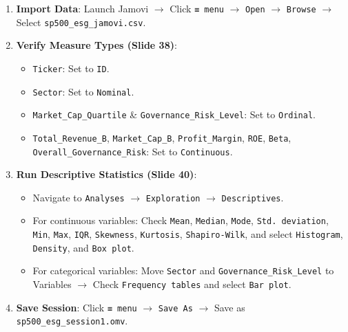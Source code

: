 \documentclass[
]{article}
\providecommand{\tightlist}{%
  \setlength{\itemsep}{0pt}\setlength{\parskip}{0pt}}
\begin{document}
\begin{enumerate}
\def\labelenumi{\arabic{enumi}.}
\tightlist
\item
  \textbf{Import Data}: Launch Jamovi \(\rightarrow\) Click
  \texttt{≡\ menu} \(\rightarrow\) \texttt{Open} \(\rightarrow\)
  \texttt{Browse} \(\rightarrow\) Select
  \texttt{sp500\_esg\_jamovi.csv}.
\item
  \textbf{Verify Measure Types (Slide 38)}:

  \begin{itemize}
  \tightlist
  \item
    \texttt{Ticker}: Set to \texttt{ID}.
  \item
    \texttt{Sector}: Set to \texttt{Nominal}.
  \item
    \texttt{Market\_Cap\_Quartile} \& \texttt{Governance\_Risk\_Level}:
    Set to \texttt{Ordinal}.
  \item
    \texttt{Total\_Revenue\_B}, \texttt{Market\_Cap\_B},
    \texttt{Profit\_Margin}, \texttt{ROE}, \texttt{Beta},
    \texttt{Overall\_Governance\_Risk}: Set to \texttt{Continuous}.
  \end{itemize}
\item
  \textbf{Run Descriptive Statistics (Slide 40)}:

  \begin{itemize}
  \tightlist
  \item
    Navigate to \texttt{Analyses} \(\rightarrow\) \texttt{Exploration}
    \(\rightarrow\) \texttt{Descriptives}.
  \item
    For continuous variables: Check \texttt{Mean}, \texttt{Median},
    \texttt{Mode}, \texttt{Std.\ deviation}, \texttt{Min}, \texttt{Max},
    \texttt{IQR}, \texttt{Skewness}, \texttt{Kurtosis},
    \texttt{Shapiro-Wilk}, and select \texttt{Histogram},
    \texttt{Density}, and \texttt{Box\ plot}.
  \item
    For categorical variables: Move \texttt{Sector} and
    \texttt{Governance\_Risk\_Level} to Variables \(\rightarrow\) Check
    \texttt{Frequency\ tables} and select \texttt{Bar\ plot}.
  \end{itemize}
\item
  \textbf{Save Session}: Click \texttt{≡\ menu} \(\rightarrow\)
  \texttt{Save\ As} \(\rightarrow\) Save as
  \texttt{sp500\_esg\_session1.omv}.
\end{enumerate}
\end{document}

